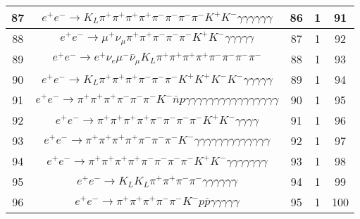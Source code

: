 \documentclass[landscape]{article}
\begin{document}
\begin{table}[htbp!]
\begin{tabular}{|c|c|c|c|c|}
\hline
87 & $ e^{+} e^{-} \rightarrow K_{L} \pi^{+} \pi^{+} \pi^{+} \pi^{+} \pi^{-} \pi^{-} \pi^{-} \pi^{-} K^{+} K^{-} \gamma \gamma \gamma \gamma \gamma \gamma $ & 86 & 1 & 91 \\
\hline
88 & $ e^{+} e^{-} \rightarrow \mu^{+} \nu_{\mu} \pi^{+} \pi^{+} \pi^{-} \pi^{-} \pi^{-} K^{+} K^{-} \gamma \gamma \gamma \gamma \gamma $ & 87 & 1 & 92 \\
\hline
89 & $ e^{+} e^{-} \rightarrow e^{+} \nu_{e} \mu^{-} \bar{\nu}_{\mu} K_{L} \pi^{+} \pi^{+} \pi^{+} \pi^{+} \pi^{-} \pi^{-} \pi^{-} \pi^{-} $ & 88 & 1 & 93 \\
\hline
90 & $ e^{+} e^{-} \rightarrow K_{L} \pi^{+} \pi^{+} \pi^{+} \pi^{-} \pi^{-} \pi^{-} K^{+} K^{+} K^{-} K^{-} \gamma \gamma \gamma \gamma \gamma $ & 89 & 1 & 94 \\
\hline
91 & $ e^{+} e^{-} \rightarrow \pi^{+} \pi^{+} \pi^{+} \pi^{-} \pi^{-} \pi^{-} K^{-} \bar{n} p \gamma \gamma \gamma \gamma \gamma \gamma \gamma \gamma \gamma \gamma \gamma \gamma \gamma \gamma \gamma \gamma $ & 90 & 1 & 95 \\
\hline
92 & $ e^{+} e^{-} \rightarrow \pi^{+} \pi^{+} \pi^{+} \pi^{+} \pi^{-} \pi^{-} \pi^{-} \pi^{-} K^{+} K^{-} \gamma \gamma \gamma \gamma $ & 91 & 1 & 96 \\
\hline
93 & $ e^{+} e^{-} \rightarrow \pi^{+} \pi^{+} \pi^{+} \pi^{+} \pi^{-} \pi^{-} \pi^{-} K^{-} \gamma \gamma \gamma \gamma \gamma \gamma \gamma \gamma \gamma \gamma \gamma \gamma \gamma $ & 92 & 1 & 97 \\
\hline
94 & $ e^{+} e^{-} \rightarrow \pi^{+} \pi^{+} \pi^{+} \pi^{+} \pi^{-} \pi^{-} \pi^{-} \pi^{-} K^{+} K^{-} \gamma \gamma \gamma \gamma \gamma \gamma \gamma $ & 93 & 1 & 98 \\
\hline
95 & $ e^{+} e^{-} \rightarrow K_{L} K_{L} \pi^{+} \pi^{+} \pi^{-} \pi^{-} \gamma \gamma \gamma \gamma \gamma \gamma $ & 94 & 1 & 99 \\
\hline
96 & $ e^{+} e^{-} \rightarrow \pi^{+} \pi^{+} \pi^{+} \pi^{-} \pi^{-} K^{-} p \bar{p} \gamma \gamma \gamma \gamma \gamma $ & 95 & 1 & 100 \\
\hline
\end{tabular}
\end{table}

\clearpage
\end{document}
